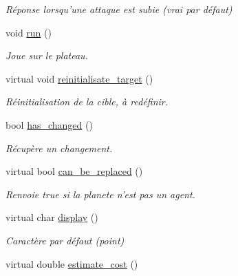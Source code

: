 \begin{DoxyCompactItemize}
\begin{DoxyCompactList}\small\item\em Réponse lorsqu'une attaque est subie (vrai par défaut) \end{DoxyCompactList}\item 
void \hyperlink{classVirtual__planet_aa063b164739842ba1c95018e24b122d5}{run} ()
\begin{DoxyCompactList}\small\item\em Joue sur le plateau. \end{DoxyCompactList}\item 
\hypertarget{classVirtual__planet_a3294db05abde3781e5ed0625d5e094a6}{virtual void \hyperlink{classVirtual__planet_a3294db05abde3781e5ed0625d5e094a6}{reinitialisate\-\_\-target} ()}\label{classVirtual__planet_a3294db05abde3781e5ed0625d5e094a6}

\begin{DoxyCompactList}\small\item\em Réinitialisation de la cible, à redéfinir. \end{DoxyCompactList}\item 
bool \hyperlink{classVirtual__planet_ab47d3e56b68242189b6df870d45c5157}{has\-\_\-changed} ()
\begin{DoxyCompactList}\small\item\em Récupère un changement. \end{DoxyCompactList}\item 
\hypertarget{classVirtual__planet_a21eeef694b6dc66b7a394bda53e9c360}{virtual bool \hyperlink{classVirtual__planet_a21eeef694b6dc66b7a394bda53e9c360}{can\-\_\-be\-\_\-replaced} ()}\label{classVirtual__planet_a21eeef694b6dc66b7a394bda53e9c360}

\begin{DoxyCompactList}\small\item\em Renvoie true si la planete n'est pas un agent. \end{DoxyCompactList}\item 
\hypertarget{classVirtual__planet_affaf5157ca3fb7e3d5c9fac1736578a3}{virtual char \hyperlink{classVirtual__planet_affaf5157ca3fb7e3d5c9fac1736578a3}{display} ()}\label{classVirtual__planet_affaf5157ca3fb7e3d5c9fac1736578a3}

\begin{DoxyCompactList}\small\item\em Caractère par défaut (point) \end{DoxyCompactList}\item 
\hypertarget{classVirtual__planet_a7f442fee301927b27217877abb765833}{virtual double \hyperlink{classVirtual__planet_a7f442fee301927b27217877abb765833}{estimate\-\_\-cost} ()}\label{classVirtual__planet_a7f442fee301927b27217877abb765833}


\end{DoxyCompactItemize}
